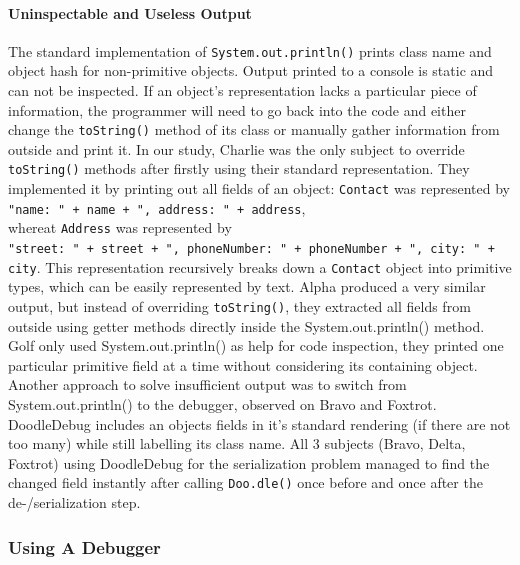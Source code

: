 \documentclass[english]{acm_proc_article-sp}
\newcommand{\nb}[2]{\nbc{#1}{#2}{orange}}
\newcommand\todo[1]{\nb{TO DO}{#1}}
\begin{document}
\paragraph{Uninspectable and Useless Output}
The standard implementation of \verb-System.out.println()- prints class name and object hash for non-primitive objects. Output printed to a console is static and can not be inspected. If an object's representation lacks a particular piece of information, the programmer will need to go back into the code and either change the \verb.toString(). method of its class or manually gather information from outside and print it. In our study, Charlie was the only subject to override \verb.toString(). methods after firstly using their standard representation. They implemented it by printing out all fields of an object: \verb.Contact. was represented by\\
\verb-"name: " + name + ", address: " + address-,\\
whereat \verb.Address. was represented by\\
\verb-"street: " + street + ", phoneNumber: " + phoneNumber + ", city: " + city-.
This representation recursively breaks down a \verb.Contact. object into primitive types, which can be easily represented by text. Alpha produced a very similar output, but instead of overriding \verb.toString()., they extracted all fields from outside using getter methods directly inside the System.out.println() method. Golf only used System.out.println() as help for code inspection, they printed one particular primitive field at a time without considering its containing object.\\
Another approach to solve insufficient output was to switch from System.out.println() to the debugger, observed on Bravo and Foxtrot.\\
DoodleDebug includes an objects fields in it's standard rendering (if there are not too many) while still labelling its class name. All 3 subjects (Bravo, Delta, Foxtrot) using DoodleDebug for the serialization problem managed to find the changed field instantly after calling \verb-Doo.dle()- once before and once after the de-/serialization step.

\subsubsection{Using A Debugger}
\todo{text}
\end{document}
